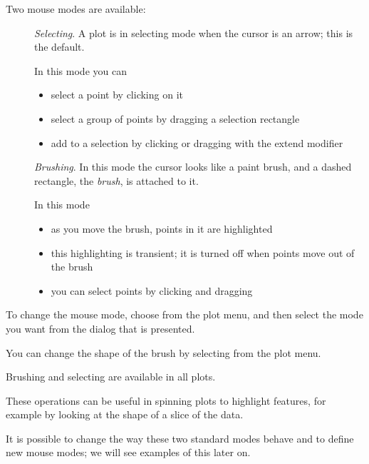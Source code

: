 \begin{slide}{}
Two mouse modes are available:
\begin{description}
\item[]
{\em Selecting}. A plot is in selecting mode when the cursor is an
arrow; this is the default.

In this mode you can 
\begin{itemize}
\item select a point by clicking on it
\item select a group of points by dragging a selection rectangle
\item add to a selection by clicking or dragging with the extend modifier
\end{itemize}
\item[]
{\em Brushing}. In this mode the cursor looks like a paint brush, and
a dashed rectangle, the {\em brush}, is attached to it.

In this mode
\begin{itemize}
\item
as you move the brush, points in it are highlighted
\item
this highlighting is transient; it is turned off when points move out
of the brush
\item you can select points by clicking and dragging
\end{itemize}
\end{description}
\end{slide}

\begin{slide}{}
To change the mouse mode, choose  from the plot
menu, and then select the mode you want from the dialog that is
presented.

You can change the shape of the brush by selecting  from the plot menu.

Brushing and selecting are available in all plots.

These operations can be useful in spinning plots to highlight
features, for example by looking at the shape of a slice of the data.

It is possible to change the way these two standard modes behave and to
define new mouse modes; we will see examples of this later on.
\end{slide}

